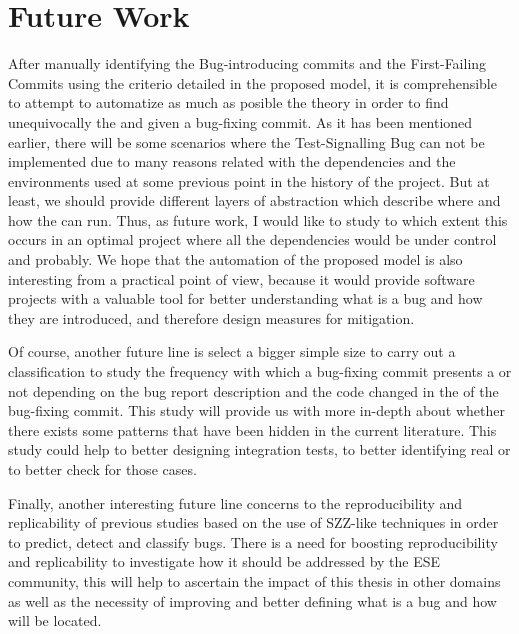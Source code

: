 \documentclass[a4paper, 12pt]{book}
\begin{document}
\section{Future Work}
\label{sec:future}

After manually identifying the Bug-introducing commits and the First-Failing Commits using the criterio detailed in the proposed model, it is comprehensible to attempt to automatize as much as posible the theory in order to find unequivocally the \BIC and \FFC given a bug-fixing commit. As it has been mentioned earlier, there will be some scenarios where the Test-Signalling Bug can not be implemented due to many reasons related with the dependencies and the environments used at some previous point in the history of the project. But at least, we should provide different layers of abstraction which describe where and how the \TSB can run. Thus, as future work, I would like to study to which extent this occurs in an optimal project where all the dependencies would be under control and probably. We hope that the automation of the proposed model is also interesting from a practical point of view, because it  would provide software projects with a valuable tool for better understanding what is a bug and how they are introduced, and therefore design measures for mitigation.

Of course, another future line is select a bigger simple size to carry out a classification to study the frequency with which a bug-fixing commit presents a \BIC or not depending on the bug report description and the code changed in the of the bug-fixing commit. This study will provide us with more in-depth about whether there exists some patterns that have been hidden in the current literature. This study could help to better designing integration tests, to better identifying real \BIC or to better check for those cases.

Finally, another interesting future line concerns to the reproducibility and replicability of previous studies based on the use of SZZ-like techniques in order to predict, detect and classify bugs. There is a need for boosting reproducibility and replicability to investigate how it should be addressed by the ESE community, this will help to ascertain the impact of this thesis in other domains as well as the necessity of improving and better defining what is a bug and how will be located.

\end{document}
